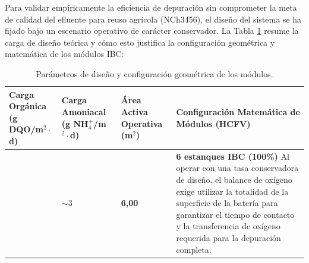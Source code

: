 \documentclass[12pt]{article}
\begin{document}
Para validar empíricamente la eficiencia de depuración sin comprometer la meta de calidad del efluente para reuso agrícola (NCh3456), el diseño del sistema se ha fijado bajo un escenario operativo de carácter conservador. La Tabla \ref{tab:fases_operacion} resume la carga de diseño teórica y cómo esto justifica la configuración geométrica y matemática de los módulos IBC:

\begin{table}[H]
    \centering
    \caption{Parámetros de diseño y configuración geométrica de los módulos.}
    \label{tab:fases_operacion}
    \vspace{0.5em}
    \begin{tabular}{>{\centering\arraybackslash}p{3cm} >{\centering\arraybackslash}p{3cm} >{\centering\arraybackslash}p{2.5cm} >{\raggedright\arraybackslash}p{5.5cm}}
        \toprule
        \textbf{Carga Orgánica (g DQO/m$^2\cdot$d)} & \textbf{Carga Amoniacal (g NH$_4^+$/m$^2\cdot$d)} & \textbf{Área Activa Operativa (m$^2$)} & \textbf{Configuración Matemática de Módulos (HCFV)} \\
        \midrule
        30 & $\sim 3$ & \textbf{6,00} & \textbf{6 estanques IBC (100\%)} \newline Al operar con una tasa conservadora de diseño, el balance de oxígeno exige utilizar la totalidad de la superficie de la batería para garantizar el tiempo de contacto y la transferencia de oxígeno requerida para la depuración completa. \\
        \bottomrule
    \end{tabular}
\end{table}
\end{document}
